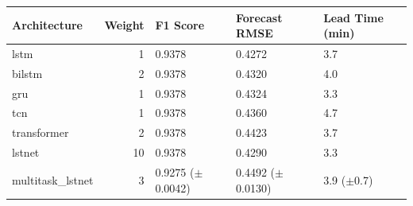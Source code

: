 \begin{tabular}{lrlll}
\toprule
Architecture & Weight & F1 Score & Forecast RMSE & Lead Time (min) \\
\midrule
lstm & 1 & 0.9378 & 0.4272 & 3.7 \\
bilstm & 2 & 0.9378 & 0.4320 & 4.0 \\
gru & 1 & 0.9378 & 0.4324 & 3.3 \\
tcn & 1 & 0.9378 & 0.4360 & 4.7 \\
transformer & 2 & 0.9378 & 0.4423 & 3.7 \\
lstnet & 10 & 0.9378 & 0.4290 & 3.3 \\
multitask_lstnet & 3 & 0.9275 ($\pm$0.0042) & 0.4492 ($\pm$0.0130) & 3.9 ($\pm$0.7) \\
\bottomrule
\end{tabular}

